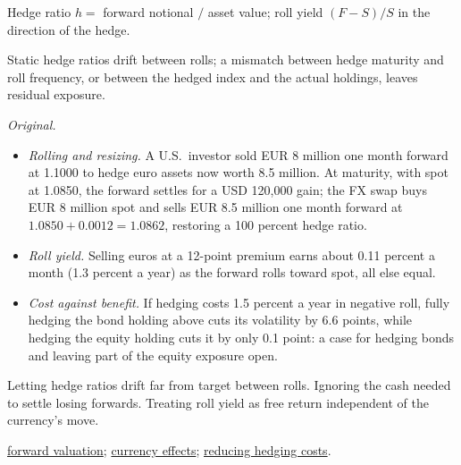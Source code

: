 \begin{qfmethod}
 Hedge ratio $h=$ forward notional $/$ asset value; roll yield $(F-S)/S$ in the direction of the hedge.

 Static hedge ratios drift between rolls; a mismatch between hedge maturity and roll frequency, or between the hedged index and the actual holdings, leaves residual exposure.

 \emph{Original.}
\begin{itemize}
\item \emph{Rolling and resizing.} A U.S.\ investor sold EUR 8 million one month forward at 1.1000 to hedge euro assets now worth 8.5 million. At maturity, with spot at 1.0850, the forward settles for a USD 120{,}000 gain; the FX swap buys EUR 8 million spot and sells EUR 8.5 million one month forward at $1.0850+0.0012=1.0862$, restoring a 100 percent hedge ratio.
\item \emph{Roll yield.} Selling euros at a 12-point premium earns about 0.11 percent a month (1.3 percent a year) as the forward rolls toward spot, all else equal.
\item \emph{Cost against benefit.} If hedging costs 1.5 percent a year in negative roll, fully hedging the bond holding above cuts its volatility by 6.6 points, while hedging the equity holding cuts it by only 0.1 point: a case for hedging bonds and leaving part of the equity exposure open.
\end{itemize}

 Letting hedge ratios drift far from target between rolls. Ignoring the cash needed to settle losing forwards. Treating roll yield as free return independent of the currency's move.

 \hyperref[meth:currency-forward-mark-to-market]{forward valuation}; \hyperref[meth:currency-portfolio-effects]{currency effects}; \hyperref[meth:currency-hedge-cost-reduction]{reducing hedging costs}.

\end{qfmethod}

